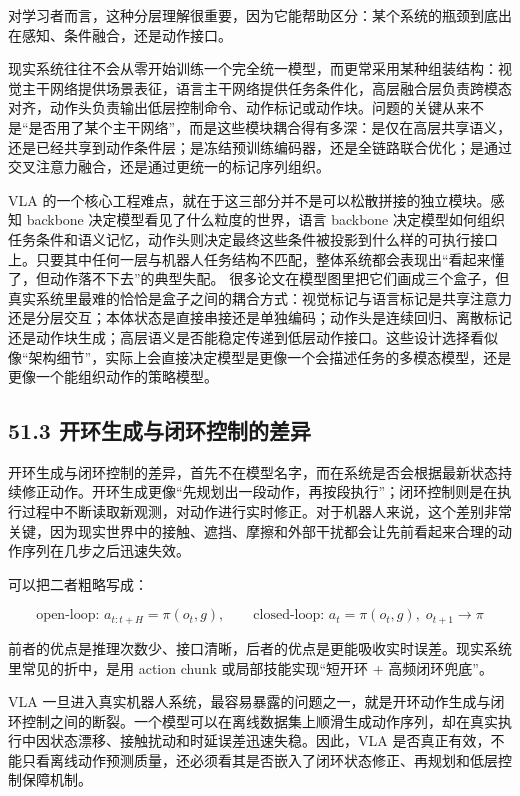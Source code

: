 对学习者而言，这种分层理解很重要，因为它能帮助区分：某个系统的瓶颈到底出在感知、条件融合，还是动作接口。

现实系统往往不会从零开始训练一个完全统一模型，而更常采用某种组装结构：视觉主干网络提供场景表征，语言主干网络提供任务条件化，高层融合层负责跨模态对齐，动作头负责输出低层控制命令、动作标记或动作块。问题的关键从来不是“是否用了某个主干网络”，而是这些模块耦合得有多深：是仅在高层共享语义，还是已经共享到动作条件层；是冻结预训练编码器，还是全链路联合优化；是通过交叉注意力融合，还是通过更统一的标记序列组织。

VLA 的一个核心工程难点，就在于这三部分并不是可以松散拼接的独立模块。感知 backbone 决定模型看见了什么粒度的世界，语言 backbone 决定模型如何组织任务条件和语义记忆，动作头则决定最终这些条件被投影到什么样的可执行接口上。只要其中任何一层与机器人任务结构不匹配，整体系统都会表现出“看起来懂了，但动作落不下去”的典型失配。 很多论文在模型图里把它们画成三个盒子，但真实系统里最难的恰恰是盒子之间的耦合方式：视觉标记与语言标记是共享注意力还是分层交互；本体状态是直接串接还是单独编码；动作头是连续回归、离散标记还是动作块生成；高层语义是否能稳定传递到低层动作接口。这些设计选择看似像“架构细节”，实际上会直接决定模型是更像一个会描述任务的多模态模型，还是更像一个能组织动作的策略模型。

\subsection*{51.3 开环生成与闭环控制的差异}


开环生成与闭环控制的差异，首先不在模型名字，而在系统是否会根据最新状态持续修正动作。开环生成更像“先规划出一段动作，再按段执行”；闭环控制则是在执行过程中不断读取新观测，对动作进行实时修正。对于机器人来说，这个差别非常关键，因为现实世界中的接触、遮挡、摩擦和外部干扰都会让先前看起来合理的动作序列在几步之后迅速失效。

可以把二者粗略写成：

\begingroup
\scriptsize
\begin{equation*}
\text{open-loop: } a_{t:t+H} = \pi(o_t, g), \qquad
\text{closed-loop: } a_t = \pi(o_t, g),\; o_{t+1}\rightarrow \pi
\end{equation*}
\endgroup

前者的优点是推理次数少、接口清晰，后者的优点是更能吸收实时误差。现实系统里常见的折中，是用 action chunk 或局部技能实现“短开环 + 高频闭环兜底”。

VLA 一旦进入真实机器人系统，最容易暴露的问题之一，就是开环动作生成与闭环控制之间的断裂。一个模型可以在离线数据集上顺滑生成动作序列，却在真实执行中因状态漂移、接触扰动和时延误差迅速失稳。因此，VLA 是否真正有效，不能只看离线动作预测质量，还必须看其是否嵌入了闭环状态修正、再规划和低层控制保障机制。

